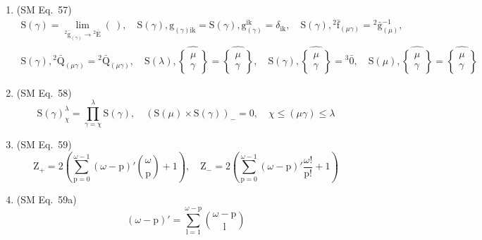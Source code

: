 \documentclass[12pt]{article}
\begin{document}
\begin{enumerate}[label=(\arabic*), series=formellist]
    \item (SM Eq.\ 57) 
    \[
    \begin{gathered}
    \mathrm{S}(\gamma) = \lim_{{}^2\bar{\mathrm{g}}_{(\gamma)} \to {}^2\bar{\mathrm{E}}} (\ ), \quad \mathrm{S}(\gamma), \mathrm{g}_{(\gamma)\mathrm{ik}} = \mathrm{S}(\gamma), \mathrm{g}_{(\gamma)}^{\mathrm{ik}} = \delta_{\mathrm{ik}}, \quad \mathrm{S}(\gamma), {}^2\bar{\mathrm{f}}_{(\mu\gamma)} = {}^2\bar{\mathrm{g}}_{(\mu)}^{-1}, \\
    \mathrm{S}(\gamma), {}^2\bar{\mathrm{Q}}_{(\mu\gamma)} = {}^2\bar{\mathrm{Q}}_{(\mu\gamma)}, \quad \mathrm{S}(\lambda), \widehat{\left\{ \begin{smallmatrix} \mu \\ \gamma \end{smallmatrix} \right\}} = \widehat{\left\{ \begin{smallmatrix} \mu \\ \gamma \end{smallmatrix} \right\}}, \quad \mathrm{S}(\gamma), \widehat{\left\{ \begin{smallmatrix} \mu \\ \gamma \end{smallmatrix} \right\}} = {}^3\bar{0}, \quad \mathrm{S}(\mu), \widehat{\left\{ \begin{smallmatrix} \mu \\ \gamma \end{smallmatrix} \right\}} = \widehat{\left\{ \begin{smallmatrix} \mu \\ \gamma \end{smallmatrix} \right\}}
    \end{gathered}
    \]

    \item (SM Eq.\ 58) 
    \[
    \mathrm{S}(\gamma)_\chi^\lambda = \prod_{\gamma=\chi}^\lambda \mathrm{S}(\gamma), \quad \left( \mathrm{S}(\mu) \times \mathrm{S}(\gamma) \right)_- = 0, \quad \chi \le (\mu\gamma) \le \lambda
    \]

    \item (SM Eq.\ 59) 
    \[
    \mathrm{Z}_+ = 2\left( \sum_{\mathrm{p}=0}^{\omega-1} (\omega-\mathrm{p})' \binom{\omega}{\mathrm{p}} + 1 \right), \quad \mathrm{Z}_- = 2\left( \sum_{\mathrm{p}=0}^{\omega-1} (\omega-\mathrm{p})' \frac{\omega!}{\mathrm{p}!} + 1 \right)
    \]

    \item (SM Eq.\ 59a) 
    \[
    (\omega-\mathrm{p})' = \sum_{\mathrm{l}=1}^{\omega-\mathrm{p}} \binom{\omega-\mathrm{p}}{\mathrm{l}}
    \]


\end{enumerate}
\end{document}
